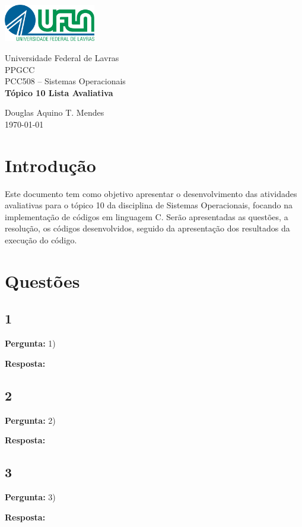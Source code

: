 \documentclass{article}
\begin{document}
\begin{titlepage}
    \centering
    \includegraphics[width=0.3\textwidth]{../../Topic1/Avaliativo/Imagens/Logo UFLA - Colorida chapada.png}

    \vspace*{2cm} %
    \Large
    Universidade Federal de Lavras\\
    PPGCC\\
    PCC508 – Sistemas Operacionais\\
    
    \vspace{2cm} %
    \huge %
    \textbf{Tópico 10 Lista Avaliativa}
    
    \vfill %
    
    \large
    Douglas Aquino T. Mendes\\
    \today %
\end{titlepage}

\tableofcontents
\newpage

\section{Introdução}
Este documento tem como objetivo apresentar o desenvolvimento das atividades avaliativas para o tópico 10 da disciplina de Sistemas Operacionais, focando na implementação de códigos em linguagem C. Serão apresentadas as questões, a resolução, os códigos desenvolvidos, seguido da apresentação dos resultados da execução do código.

\section{Questões}

\subsection{1}
\textbf{Pergunta:} 1) \newline

\textbf{Resposta:}  

\subsection{2}

\textbf{Pergunta:} 2)  \newline

\textbf{Resposta:}  

\subsection{3}

\textbf{Pergunta:} 3)  \newline

\textbf{Resposta: }

\printbibliography %
\end{document}
